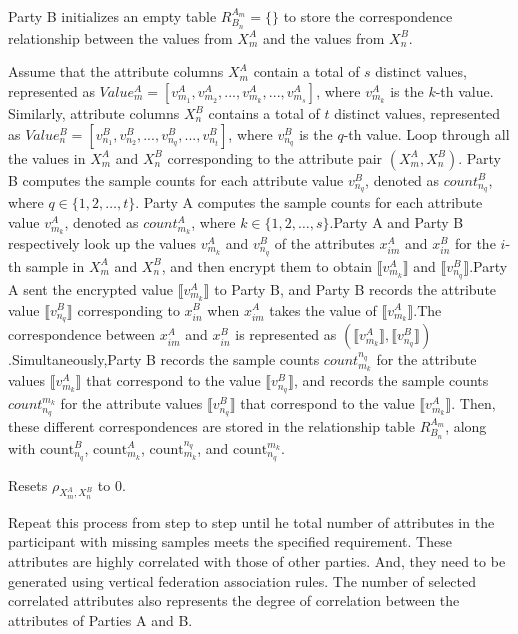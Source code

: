 \documentclass[final,1p,times]{elsarticle}
\begin{document}
Party B initializes an empty table $R_{B_n}^{A_m}=\{\}$ to store the correspondence relationship between the values from $X_m^A$ and the values from $X_n^B$.

Assume that the attribute columns $X_m^A$ contain a total of $s$ distinct values, represented as $Value_m^A=[v_{m_1}^A,v_{m_2}^A,...,v_{m_k}^A,...,v_{m_s}^A]$, where ${v_{m_{k}}^{A}}$ is the $k$-th value. Similarly, attribute columns $X_n^B$ contains a total of $t$ distinct values, represented as $Value_{n}^{B}=[v_{n_{1}}^{B},v_{n_{2}}^{B},...,v_{n_{q}}^{B},...,v_{n_{t}}^{B}]$, where ${v_{n_{q}}^{B}}$ is the $q$-th value. Loop through all the values in \(X_m^A\) and \(X_n^B\) corresponding to the attribute pair \((X_m^A,X_n^B)\). Party B computes the sample counts for each attribute value \( v_{n_q}^B \), denoted as \( {count}_{n_q}^B \), where \( q \in \{1,2,\dots,t\} \). Party A computes the sample counts for each attribute value \( v_{m_k}^A \), denoted as \( {count}_{m_k}^A \), where \( k \in \{1,2,\dots,s\} \).Party A and Party B respectively look up the values ${v_{m_{k}}^{A}}$ and ${v_{n_{q}}^{B}}$ of the attributes $x_{im}^A$ and $x_{in}^B$ for the $i$-th sample in $X_m^A$ and $X_n^B$, and then encrypt them to obtain $\llbracket {v_{m_{k}}^{A}} \rrbracket$ and $\llbracket {v_{n_{q}}^{B}} \rrbracket$.Party A sent the encrypted value $\llbracket {v_{m_{k}}^{A}}\rrbracket$ to Party B, and Party B records the attribute value $\llbracket {v_{n_{q}}^{B}}\rrbracket$ corresponding to $x_{in}^B$ when $x_{im}^A$ takes the value of $\llbracket {v_{m_{k}}^{A}} \rrbracket$.The correspondence between $x_{im}^A$ and $x_{in}^B$ is represented as $(\llbracket{v_{m_k}^A}\rrbracket,\llbracket{v_{n_q}^B}\rrbracket)$.Simultaneously,Party B records the sample counts \( {count}_{m_k}^{n_q} \) for the attribute values \( \llbracket v_{m_k}^A \rrbracket \) that correspond to the value \( \llbracket v_{n_q}^B \rrbracket \), and records the sample counts \( {count}_{n_q}^{m_k} \) for the attribute values \( \llbracket v_{n_q}^B \rrbracket \) that correspond to the value \( \llbracket v_{m_k}^A \rrbracket \). Then, these different correspondences are stored in the relationship table ${R_{B_n}^{A_m}}$, along with \( \text{count}_{n_q}^B \), \( \text{count}_{m_k}^A \), \( \text{count}_{m_k}^{n_q} \), and \( \text{count}_{n_q}^{m_k} \).

Resets $ \rho_{{X}_m^A, {X}_n^B} $ to 0.

Repeat this process from step  to step  until he total number of attributes in the participant with missing samples meets the specified requirement. These attributes are highly correlated with those of other parties. And, they need to be generated using vertical federation association rules. The number of selected correlated attributes also represents the degree of correlation between the attributes of Parties A and B.
\end{document}
